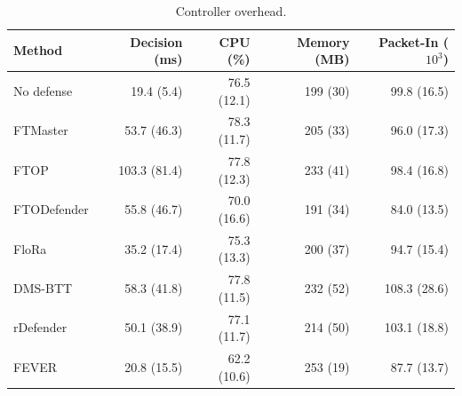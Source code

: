 \begin{table}[t]
\centering
\caption{Controller overhead.}
\label{tab:overhead}
\small
\setlength{\tabcolsep}{4pt}
\begin{tabular}{lrrrr}
\toprule
Method & Decision (ms) & CPU (\%) & Memory (MB) & Packet-In ($10^3$) \\
\midrule
No defense & 19.4 (5.4) & 76.5 (12.1) & 199 (30) & 99.8 (16.5) \\
FTMaster & 53.7 (46.3) & 78.3 (11.7) & 205 (33) & 96.0 (17.3) \\
FTOP & 103.3 (81.4) & 77.8 (12.3) & 233 (41) & 98.4 (16.8) \\
FTODefender & 55.8 (46.7) & 70.0 (16.6) & 191 (34) & 84.0 (13.5) \\
FloRa & 35.2 (17.4) & 75.3 (13.3) & 200 (37) & 94.7 (15.4) \\
DMS-BTT & 58.3 (41.8) & 77.8 (11.5) & 232 (52) & 108.3 (28.6) \\
rDefender & 50.1 (38.9) & 77.1 (11.7) & 214 (50) & 103.1 (18.8) \\
FEVER & 20.8 (15.5) & 62.2 (10.6) & 253 (19) & 87.7 (13.7) \\
\bottomrule
\end{tabular}
\end{table}
